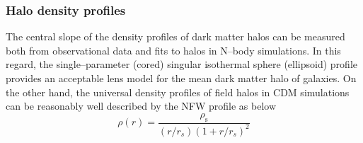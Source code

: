 \documentclass[paper=a4, fontsize=11pt]{scrartcl} %
\numberwithin{equation}{section} %
\numberwithin{figure}{section} %
\numberwithin{table}{section} %
\begin{document}



\subsubsection*{Halo density profiles}


The central slope of the density profiles of dark matter halos can be measured both from observational data and fits to halos in N--body simulations. In this regard, the single--parameter (cored) singular isothermal sphere (ellipsoid) profile provides an acceptable lens model for the mean dark matter halo of galaxies. On the other hand, the universal density profiles of field halos in CDM simulations can be reasonably well described by the NFW profile as below
\begin{equation}
\label{eq:NFW}
\rho(r)=\frac{\rho_\mathrm{s}}{(r/r_s)(1+r/r_s)^{2}} \nonumber
\end{equation}
\end{document}
